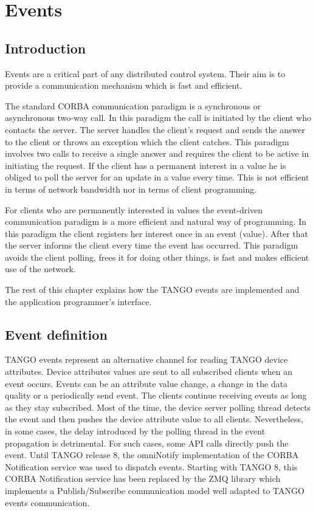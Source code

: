 \section{Events}


\subsection{Introduction}

Events are a critical part of any distributed control system. Their
aim is to provide a communication mechanism which is fast and efficient. 

The standard CORBA communication paradigm is a synchronous or asynchronous
two-way call. In this paradigm the call is initiated by the client
who contacts the server. The server handles the client's request and
sends the answer to the client or throws an exception which the client
catches. This paradigm involves two calls to receive a single answer
and requires the client to be active in initiating the request. If
the client has a permanent interest in a value he is obliged to poll
the server for an update in a value every time. This is not efficient
in terms of network bandwidth nor in terms of client programming.

For clients who are permanently interested in values the event-driven
communication paradigm is a more efficient and natural way of programming.
In this paradigm the client registers her interest once in an event
(value). After that the server informs the client every time the event
has occurred. This paradigm avoids the client polling, frees it for
doing other things, is fast and makes efficient use of the network.

The rest of this chapter explains how the TANGO events are implemented
and the application programmer's interface.


\subsection{Event definition}

TANGO events represent an alternative channel for reading TANGO device
attributes. Device attributes values are sent to
all subscribed clients when an event occurs. Events can be an attribute
value change, a change in the data quality or a periodically send
event. The clients continue receiving events as long as they stay
subscribed. Most of the time, the device server polling thread detects
the event and then pushes the device attribute value to all clients.
Nevertheless, in some cases, the delay introduced by the polling thread
in the event propagation is detrimental. For such cases, some API
calls directly push the event. Until TANGO release 8, the omniNotify
implementation of the CORBA Notification service
was used to dispatch events. Starting with TANGO 8, this CORBA Notification
service has been replaced by the ZMQ library which implements
a Publish/Subscribe communication model well adapted to TANGO events
communication.


